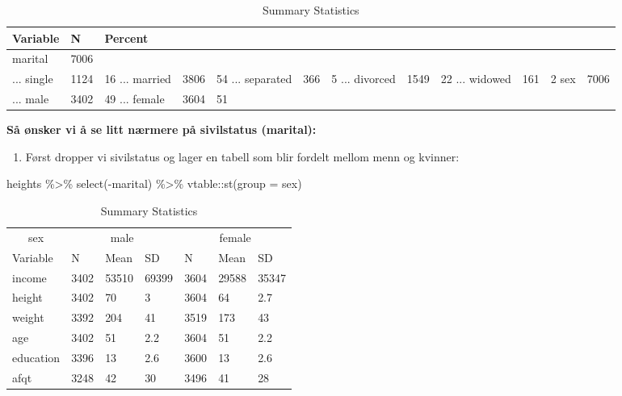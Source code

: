 \documentclass[
  letterpaper,
  DIV=11,
  numbers=noendperiod]{scrartcl}
\newenvironment{Shaded}{\begin{snugshade}}{\end{snugshade}}
\newcommand{\AttributeTok}[1]{\textcolor[rgb]{0.40,0.45,0.13}{#1}}
\newcommand{\FunctionTok}[1]{\textcolor[rgb]{0.28,0.35,0.67}{#1}}
\newcommand{\NormalTok}[1]{\textcolor[rgb]{0.00,0.23,0.31}{#1}}
\newcommand{\SpecialCharTok}[1]{\textcolor[rgb]{0.37,0.37,0.37}{#1}}
\newcommand{\StringTok}[1]{\textcolor[rgb]{0.13,0.47,0.30}{#1}}
\providecommand{\tightlist}{%
  \setlength{\itemsep}{0pt}\setlength{\parskip}{0pt}}\usepackage{longtable,booktabs,array}
\begin{document}
\begin{table}

\caption{Summary Statistics}
\centering
\begin{tabular}[t]{lll}
\toprule
Variable & N & Percent\\
\midrule
marital & 7006 & \\
... single & 1124 & 16%
... married & 3806 & 54%
... separated & 366 & 5%
... divorced & 1549 & 22%
\addlinespace
... widowed & 161 & 2%
sex & 7006 & \\
... male & 3402 & 49%
... female & 3604 & 51%
\bottomrule
\end{tabular}
\end{table}

\textbf{Så ønsker vi å se litt nærmere på sivilstatus (marital):}

\begin{enumerate}
\def\labelenumi{\arabic{enumi}.}
\tightlist
\item
  Først dropper vi sivilstatus og lager en tabell som blir fordelt
  mellom menn og kvinner:
\end{enumerate}

\begin{Shaded}
\begin{Highlighting}[]
\NormalTok{heights }\SpecialCharTok{\%\textgreater{}\%} 
  \FunctionTok{select}\NormalTok{(}\SpecialCharTok{{-}}\NormalTok{marital) }\SpecialCharTok{\%\textgreater{}\%} 
\NormalTok{  vtable}\SpecialCharTok{::}\FunctionTok{st}\NormalTok{(}\AttributeTok{group =} \StringTok{\textquotesingle{}sex\textquotesingle{}}\NormalTok{)}
\end{Highlighting}
\end{Shaded}

\begin{table}

\caption{Summary Statistics}
\centering
\begin{tabular}[t]{lllllll}
\toprule
\multicolumn{1}{c}{sex} & \multicolumn{3}{c}{male} & \multicolumn{3}{c}{female} \\
\cmidrule(l{3pt}r{3pt}){1-1} \cmidrule(l{3pt}r{3pt}){2-4} \cmidrule(l{3pt}r{3pt}){5-7}
Variable & N & Mean & SD & N & Mean & SD\\
\midrule
income & 3402 & 53510 & 69399 & 3604 & 29588 & 35347\\
height & 3402 & 70 & 3 & 3604 & 64 & 2.7\\
weight & 3392 & 204 & 41 & 3519 & 173 & 43\\
age & 3402 & 51 & 2.2 & 3604 & 51 & 2.2\\
education & 3396 & 13 & 2.6 & 3600 & 13 & 2.6\\
\addlinespace
afqt & 3248 & 42 & 30 & 3496 & 41 & 28\\
\bottomrule
\end{tabular}
\end{table}
\end{document}
